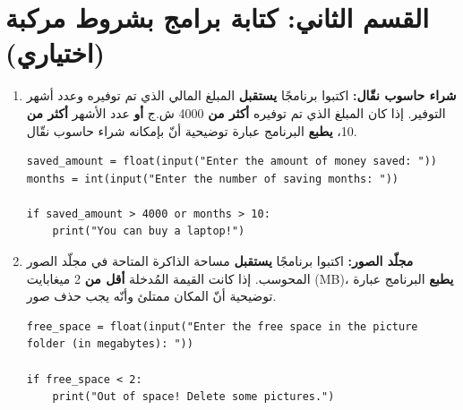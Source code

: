\documentclass[14pt]{extarticle}
\begin{document}
\clearpage
\section*{القسم الثاني: كتابة برامج بشروط مركبة (اختياري)}

\begin{enumerate}[resume, label=\textbf{تمرين \arabic*:}, wide=0pt, itemsep=2.2em]

\item \textbf{شراء حاسوب نقّال:} اكتبوا برنامجًا \textbf{يستقبل} المبلغ المالي الذي تم توفيره وعدد أشهر التوفير. إذا كان المبلغ الذي تم توفيره \textbf{أكثر من} 4000 ش.ج \textbf{أو} عدد الأشهر \textbf{أكثر من} 10، \textbf{يطبع} البرنامج عبارة توضيحية أنّ بإمكانه شراء حاسوب نقّال.

\ifwithsols
\begin{boxSolution}
\begin{english}
\begin{verbatim}
saved_amount = float(input("Enter the amount of money saved: "))
months = int(input("Enter the number of saving months: "))

if saved_amount > 4000 or months > 10:
    print("You can buy a laptop!")
\end{verbatim}
\end{english}
\end{boxSolution}

\filbreak
\fi

\item \textbf{مجلّد الصور:} اكتبوا برنامجًا \textbf{يستقبل} مساحة الذاكرة المتاحة في مجلّد الصور المحوسب. إذا كانت القيمة المُدخلة \textbf{أقل من} 2 ميغابايت (\textenglish{MB})، \textbf{يطبع} البرنامج عبارة توضيحية أنّ المكان ممتلئ وأنّه يجب حذف صور.

\ifwithsols
\begin{boxSolution}
\begin{english}
\begin{verbatim}
free_space = float(input("Enter the free space in the picture folder (in megabytes): "))

if free_space < 2:
    print("Out of space! Delete some pictures.")
\end{verbatim}
\end{english}
\end{boxSolution}


\end{enumerate}
\end{document}
